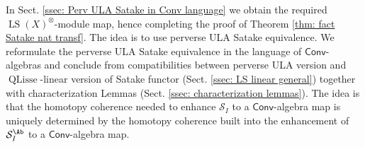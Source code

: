 \documentclass[10pt]{amsart}
\theoremstyle{remark}
\newcommand{\on}{\operatorname}
\newcommand{\cS}{\mathcal{S}}
\newcommand{\LS}{\on{LS}}
\newcommand{\QLisse}{\on{QLisse}}
\newcommand{\Conv}{\mathsf{Conv}}
\begin{document}
In Sect. \ref{ssec: Perv ULA Satake in Conv language} we obtain the required $\LS(X)^{\otimes}$-module map, hence completing the proof of Theorem \ref{thm: fact Satake nat transf}. The idea is to use perverse ULA Satake equivalence. We reformulate the perverse ULA Satake equivalence in the language of $\Conv$-algebras and conclude from compatibilities between perverse ULA version and $\QLisse$-linear version of Satake functor (Sect. \ref{ssec: LS linear general}) together with characterization Lemmas (Sect. \ref{ssec: characterization lemmas}). The idea is that the homotopy coherence needed to enhance $\cS_{I}$ to a $\Conv$-algebra map is uniquely determined by the homotopy coherence built into the enhancement of $\cS^{\Ab}_I$ to a $\Conv$-algebra map.
\end{document}
